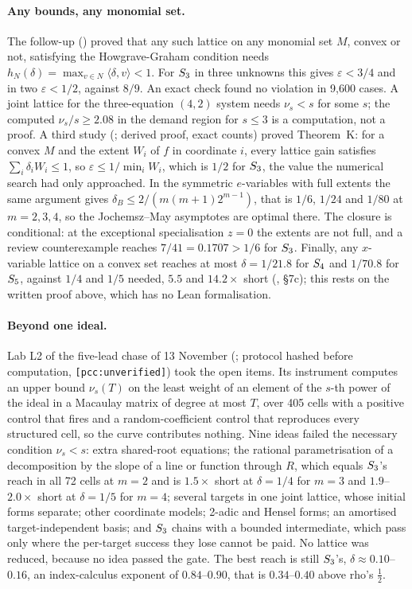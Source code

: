 \paragraph{Any bounds, any monomial set.} The follow-up
() proved that any such lattice
on any monomial set $M$, convex or not, satisfying the Howgrave-Graham
condition needs $h_N(\delta)=\max_{v\in N}\langle\delta,v\rangle<1$. For
$S_{3}$ in three unknowns this gives $\varepsilon<3/4$ and in two
$\varepsilon<1/2$, against $8/9$. An exact check found no violation in 9{,}600
cases. A joint lattice for the three-equation $(4,2)$ system needs
$\nu_s<s$ for some $s$; the computed $\nu_s/s\ge2.08$ in the demand region
for $s\le3$ is a computation, not a proof. A third study
(; derived proof, exact counts)
proved Theorem~K: for a convex $M$ and the extent $W_i$ of $f$ in
coordinate $i$, every lattice gain satisfies $\sum_i\delta_iW_i\le1$, so
$\varepsilon\le1/\min_iW_i$, which is $1/2$ for $S_{3}$, the value the
numerical search had only approached. In the symmetric $e$-variables with
full extents the same argument gives $\delta_B\le2/(m(m+1)2^{m-1})$, that is
$1/6$, $1/24$ and $1/80$ at $m=2,3,4$, so the Jochemsz--May asymptotes are
optimal there. The closure is conditional: at the exceptional
specialisation $z=0$ the extents are not full, and a review counterexample
reaches $7/41=0.1707>1/6$ for $S_{3}$. Finally, any $x$-variable lattice on
a convex set reaches at most $\delta=1/21.8$ for $S_{4}$ and $1/70.8$ for
$S_{5}$, against $1/4$ and $1/5$ needed, $5.5$ and $14.2\times$ short
(, \S7c); this rests on
the written proof above, which has no Lean formalisation.

\paragraph{Beyond one ideal.} Lab L2 of the five-lead chase of 13
November (;
protocol hashed before computation, \texttt{[pcc:unverified]}) took the open
items. Its instrument computes an upper bound $\nu_s(T)$ on the least weight
of an element of the $s$-th power of the ideal in a Macaulay matrix of
degree at most $T$, over 405 cells with a positive control that fires and
a random-coefficient control that reproduces every structured cell, so the
curve contributes nothing. Nine ideas failed the necessary condition
$\nu_s<s$: extra shared-root equations; the rational parametrisation of a
decomposition by the slope of a line or function through $R$, which equals
$S_{3}$'s reach in all 72 cells at $m=2$ and is $1.5\times$ short at
$\delta=1/4$ for $m=3$ and $1.9$--$2.0\times$ short at $\delta=1/5$ for
$m=4$; several targets in one joint lattice, whose initial forms separate;
other coordinate models; 2-adic and Hensel forms; an amortised
target-independent basis; and $S_{3}$ chains with a bounded intermediate,
which pass only where the per-target success they lose cannot be paid. No
lattice was reduced, because no idea passed the gate. The best reach is
still $S_{3}$'s, $\delta\approx0.10$--$0.16$, an index-calculus exponent of
$0.84$--$0.90$, that is $0.34$--$0.40$ above rho's $\tfrac12$.

